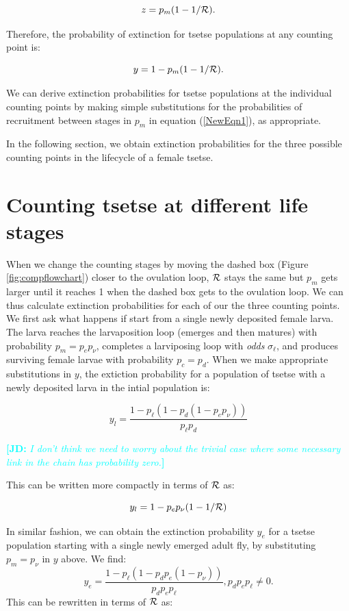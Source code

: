 \documentclass[smallextended]{svjour3}
\newcommand{\comment}[3]{\textcolor{#1}{\textbf{[#2: }\textit{#3}\textbf{]}}}
\newcommand{\jd}[1]{\comment{cyan}{JD}{#1}}
\begin{document}
$$ z = p_m(1-1/{\cal R}).$$

Therefore,  the probability of extinction for tsetse populations at any counting point is:

\begin{equation}
\label{NewEqn1}	
y = 1 - p_m(1-1/{\cal R}).	
\end{equation}

We can derive extinction probabilities for tsetse populations at the individual counting points by making simple substitutions for the probabilities of recruitment  between stages in $p_m$  in equation (\ref{NewEqn1}), as appropriate. 

In the following section, we obtain extinction probabilities  for the three possible counting points in the lifecycle of a female tsetse.

\section{Counting tsetse at different life stages}

When we change the counting stages by moving the dashed box (Figure \ref{fig:compflowchart}) closer to the ovulation loop, ${\cal R}$ stays the same but $p_m$ gets larger until it reaches 1 when the dashed box gets to the ovulation loop. We can thus calculate extinction probabilities for each of our the three counting points. We first ask what happens if start from a single newly deposited female larva.
The larva reaches the larvaposition loop (emerges and then matures) with probability $p_m = p_e p_{\nu}$, completes a larviposing loop with \textit{odds} $\sigma_\ell$, and produces surviving female larvae with probability $p_c = p_d$. 
When we make appropriate substitutions in $y$, the extiction probability for a population of tsetse with a newly deposited larva in the intial population is:

$$y_l = \frac{1-p_{\ell}(1 - p_{d}(1 - p_{e}p_{\nu}))}{p_{\ell}p_{d}}$$

\jd{I don't think we need to worry about the trivial case where some necessary link in the chain has probability zero.}

This can be written more compactly in terms of ${\cal R}$ as:

\begin{equation}
\label{NewEqn2}
y_l = 1 - p_ep_{\nu}(1-1/{\cal R})	
\end{equation}

In similar fashion, we can obtain the extinction probability $y_e$ for a tsetse population starting with a single newly emerged adult fly, by substituting  $p_m = p_{\nu}$ in $y$ above.
We find:
$$ y_e=\frac{1- p_{\ell}(1 -p_{d}p_{e}(1- p_{\nu}))}{p_{d}p_{e}p_{\ell}},  p_{d}p_{e}p_{\ell} \neq 0. $$ This can be rewritten in terms of ${\cal R}$ as:
\end{document}
